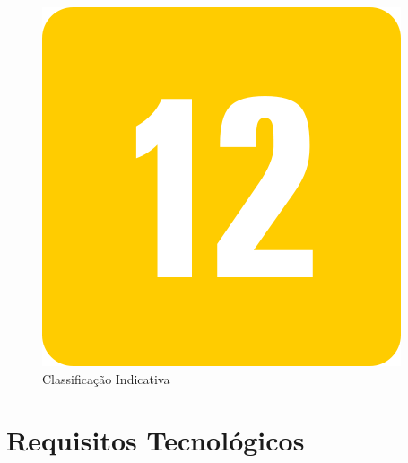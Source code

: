 \documentclass[11pt]{article} %
\begin{document}
\begin{figure}[!htp]
\centering
\includegraphics[scale=0.5]{res/classification.png}
\caption{Classificação Indicativa}
\label{Classificação Indicativa}
\end{figure}

\section{Requisitos Tecnológicos}
\end{document}
